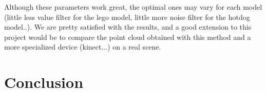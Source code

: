 \documentclass{article}
\begin{document}
Although these parameters work great, the optimal ones may vary for each model (little less value filter for the lego model, little more noise filter for the hotdog model..). We are pretty satisfied with the results, and a good extension to this project would be to compare the point cloud obtained with this method and a more specialized device (kinect...) on a real scene.


\section{Conclusion}
\newpage


\end{document}
